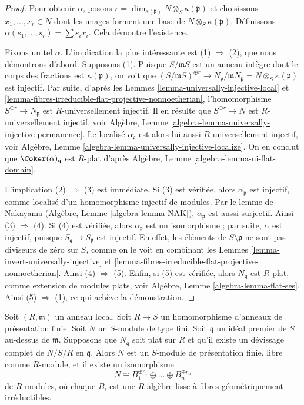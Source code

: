 \begin{proof}
Pour obtenir $\alpha$, posons
$r = \dim_{\kappa(\mathfrak p)} N \otimes_S \kappa(\mathfrak p)$ et choisissons
$x_1, \ldots, x_r \in N$ dont les images forment une base de
$N \otimes_S \kappa(\mathfrak p)$. Définissons
$\alpha(s_1, \ldots, s_r) = \sum s_i x_i$. Cela démontre l'existence.

\medskip\noindent
Fixons un tel $\alpha$. L'implication la plus intéressante est
(1) $\Rightarrow$ (2), que nous démontrons d'abord. Supposons (1).
Puisque $S/\mathfrak mS$ est un anneau intègre dont le corps des fractions est $\kappa(\mathfrak p)$,
on voit que
$(S/\mathfrak mS)^{\oplus r} \to
N_{\mathfrak p}/\mathfrak mN_{\mathfrak p} = N \otimes_S \kappa(\mathfrak p)$
est injectif. Par suite, d'après les
Lemmes \ref{lemma-universally-injective-local} et
\ref{lemma-fibres-irreducible-flat-projective-nonnoetherian},
l'homomorphisme $S^{\oplus r} \to N_{\mathfrak p}$ est $R$-universellement injectif.
Il en résulte que $S^{\oplus r} \to N$ est $R$-universellement injectif, voir
Algèbre, Lemme \ref{algebra-lemma-universally-injective-permanence}.
Le localisé $\alpha_{\mathfrak q}$ est alors lui aussi $R$-universellement
injectif, voir
Algèbre, Lemme \ref{algebra-lemma-universally-injective-localize}.
On en conclut que $\Coker(\alpha)_{\mathfrak q}$ est $R$-plat d'après
Algèbre, Lemme \ref{algebra-lemma-ui-flat-domain}.

\medskip\noindent
L'implication (2) $\Rightarrow$ (3) est immédiate. Si (3) est vérifiée, alors
$\alpha_{\mathfrak p}$ est injectif, comme localisé d'un homomorphisme injectif
de modules. Par le lemme de Nakayama
(Algèbre, Lemme \ref{algebra-lemma-NAK}),
$\alpha_{\mathfrak p}$ est aussi surjectif. Ainsi (3) $\Rightarrow$ (4).
Si (4) est vérifiée, alors $\alpha_{\mathfrak p}$ est un isomorphisme ; par suite,
$\alpha$ est injectif, puisque $S_{\mathfrak q} \to S_{\mathfrak p}$ est injectif.
En effet, les éléments de $S \setminus \mathfrak p$ ne sont pas diviseurs de zéro sur $S$,
comme on le voit en combinant les
Lemmes \ref{lemma-invert-universally-injective} et
\ref{lemma-fibres-irreducible-flat-projective-nonnoetherian}.
Ainsi (4) $\Rightarrow$ (5). Enfin, si (5) est vérifiée, alors
$N_{\mathfrak q}$ est $R$-plat, comme extension de modules plats, voir
Algèbre, Lemme \ref{algebra-lemma-flat-ses}.
Ainsi (5) $\Rightarrow$ (1), ce qui achève la démonstration.
\end{proof}

\begin{lemma}
\label{lemma-complete-devissage-flat-finite-type-module}
Soit $(R, \mathfrak m)$ un anneau local.
Soit $R \to S$ un homomorphisme d'anneaux de présentation finie.
Soit $N$ un $S$-module de type fini.
Soit $\mathfrak q$ un idéal premier de $S$ au-dessus de $\mathfrak m$.
Supposons que $N_{\mathfrak q}$ soit plat sur $R$ et
qu'il existe un d\'evissage complet de $N/S/R$ en $\mathfrak q$.
Alors $N$ est un $S$-module de présentation finie, libre comme $R$-module,
et il existe un isomorphisme
$$
N \cong B_1^{\oplus r_1} \oplus \ldots \oplus B_n^{\oplus r_n}
$$
de $R$-modules, où chaque $B_i$ est une $R$-algèbre lisse à fibres géométriquement
irréductibles.
\end{lemma}

